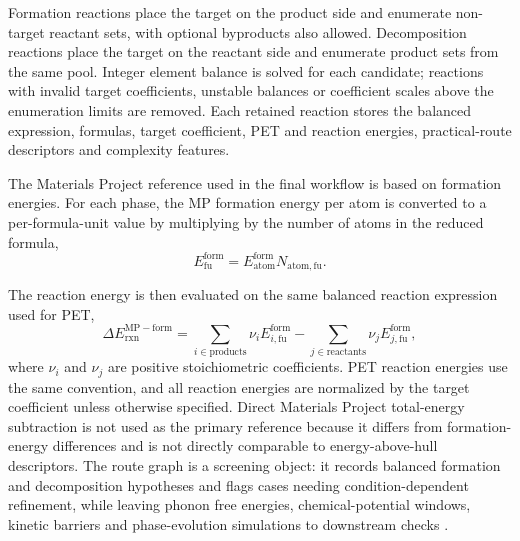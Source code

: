 \documentclass[11pt, letterpaper]{article}
\begin{document}
Formation reactions place the target on the product side and enumerate non-target reactant sets, with optional byproducts also allowed. Decomposition reactions place the target on the reactant side and enumerate product sets from the same pool. Integer element balance is solved for each candidate; reactions with invalid target coefficients, unstable balances or coefficient scales above the enumeration limits are removed. Each retained reaction stores the balanced expression, formulas, target coefficient, PET and \mpform{} reaction energies, practical-route descriptors and complexity features.

The Materials Project reference used in the final workflow is based on formation energies. For each phase, the MP formation energy per atom is converted to a per-formula-unit value by multiplying by the number of atoms in the reduced formula,
\begin{equation}
E^{\mathrm{form}}_{\mathrm{fu}} = E^{\mathrm{form}}_{\mathrm{atom}} N_{\mathrm{atom,fu}}.
\end{equation}

The \mpform{} reaction energy is then evaluated on the same balanced reaction expression used for PET,
\begin{equation}
\Delta E^{\mathrm{MP-form}}_{\mathrm{rxn}}
=
\sum_{i \in \mathrm{products}} \nu_i E^{\mathrm{form}}_{i,\mathrm{fu}}
-
\sum_{j \in \mathrm{reactants}} \nu_j E^{\mathrm{form}}_{j,\mathrm{fu}},
\end{equation}
where $\nu_i$ and $\nu_j$ are positive stoichiometric coefficients. PET reaction energies use the same convention, and all reaction energies are normalized by the target coefficient unless otherwise specified. Direct Materials Project total-energy subtraction is not used as the primary reference because it differs from formation-energy differences and is not directly comparable to energy-above-hull descriptors. The route graph is a screening object: it records balanced formation and decomposition hypotheses and flags cases needing condition-dependent refinement, while leaving phonon free energies, chemical-potential windows, kinetic barriers and phase-evolution simulations to downstream checks \cite{buckeridge2014chemical_potentials,togo2015phonon,henkelman2000neb,gallant2024reactca}.
\end{document}
